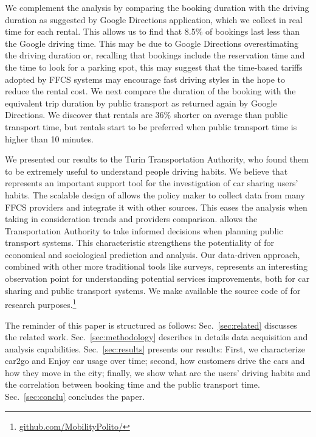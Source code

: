 
We complement the analysis by comparing the booking duration with the driving duration as suggested by Google Directions application, which we collect in real time for each rental. This allows us to find that 8.5\% of bookings last less than the Google driving time. 
This may be due to Google Directions overestimating the driving duration or, recalling that bookings  include the reservation time and the time to look for a parking spot, this may suggest that the time-based tariffs adopted by FFCS systems may encourage fast driving styles in the hope to reduce the rental cost.
We next compare the duration of the booking with the equivalent trip duration by public transport as returned again by Google Directions. We discover that rentals are 36\% shorter on average than public transport time, but  rentals start to be preferred when public transport time is higher than 10 minutes.

We presented our results to the Turin Transportation Authority, who found them to be extremely useful to understand people driving habits. We believe that \tool represents an important support tool for the investigation of car sharing users' habits. The scalable design of \tool allows the policy maker to collect data from many FFCS providers  and integrate it with other sources. This eases the analysis when taking in consideration trends and providers comparison. \tool allows the Transportation Authority to take informed decisions when planning public transport systems. This characteristic strengthens the potentiality of \tool for economical and sociological prediction and analysis. Our data-driven approach, combined with other more traditional tools like surveys, represents an interesting observation point for understanding potential services improvements, both for car sharing and public transport systems. We make available the source code of \tool for research purposes.\footnote{\url{github.com/MobilityPolito/}}

The reminder of this paper is structured as follows: Sec.~\ref{sec:related} discusses the related work. 
Sec.~\ref{sec:methodology} describes in details \tool data acquisition and analysis capabilities. Sec.~\ref{sec:results} presents our results: First, we characterize car2go and Enjoy car usage over time; second, how customers drive the cars and how they move in the city; finally, we show what are the users' driving habits and the correlation between booking time and the public transport time. Sec.~\ref{sec:conclu} concludes the paper.


